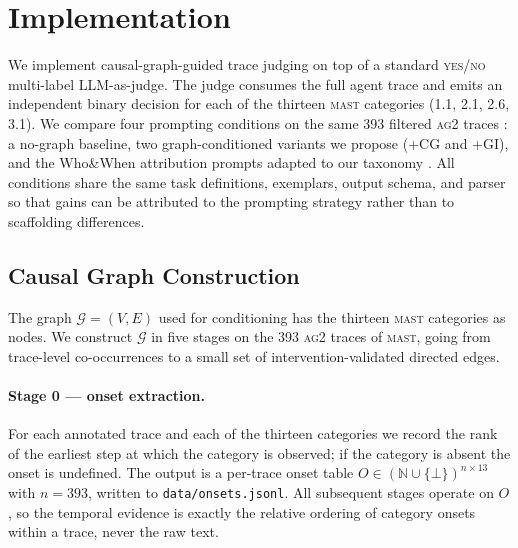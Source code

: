 %
%

\section{Implementation}
\label{sec:implementation}

We implement causal-graph-guided trace judging on top of a standard
\textsc{yes/no} multi-label LLM-as-judge. The judge consumes the full agent
trace and emits an independent binary decision for each of the thirteen
\textsc{mast} categories (1.1, 2.1, 2.6,
3.1). We compare four prompting conditions on the same 393
filtered \textsc{ag2} traces \citep{cemri2025whymast}: a no-graph baseline,
two graph-conditioned variants we propose (\textsc{+CG} and \textsc{+GI}),
and the Who\&When attribution prompts adapted to our taxonomy
\citep{yin2025whoandwhen}. All conditions share the same task definitions,
exemplars, output schema, and parser so that gains can be attributed to the
prompting strategy rather than to scaffolding differences.

\subsection{Causal Graph Construction}
\label{ssec:graph}

The graph $\mathcal{G}=(V,E)$ used for conditioning has the thirteen
\textsc{mast} categories as nodes. We construct $\mathcal{G}$ in five
stages on the 393 \textsc{ag2} traces of \textsc{mast}, going from
trace-level co-occurrences to a small set of intervention-validated
directed edges.

\paragraph{Stage 0 — onset extraction.}
For each annotated trace and each of the thirteen categories we record
the rank of the earliest step at which the category is observed; if the
category is absent the onset is undefined. The output is a per-trace
onset table $O \in (\mathbb{N}\cup\{\bot\})^{n\times 13}$ with
$n{=}393$, written to \texttt{data/onsets.jsonl}. All subsequent stages
operate on $O$, so the temporal evidence is exactly the relative ordering
of category onsets within a trace, never the raw text.

